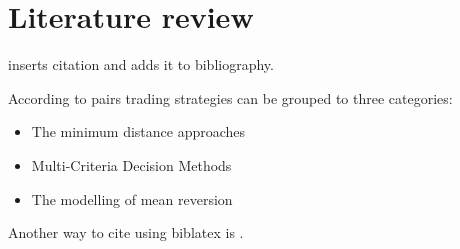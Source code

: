 \section{Literature review}

\cite{focardiNewApproachStatistical2016} inserts citation and adds it to bibliography. 

According to \cite{huckPairsTradingSelection2015} pairs trading strategies can be grouped to three categories:
\vspace{-5mm}
\begin{itemize}[noitemsep]
  \item The minimum distance approaches
  \item Multi-Criteria Decision Methods
  \item The modelling of mean reversion 
\end{itemize}


Another way to cite using biblatex is \parencite{huckPairsTradingOutranking2010}. 

